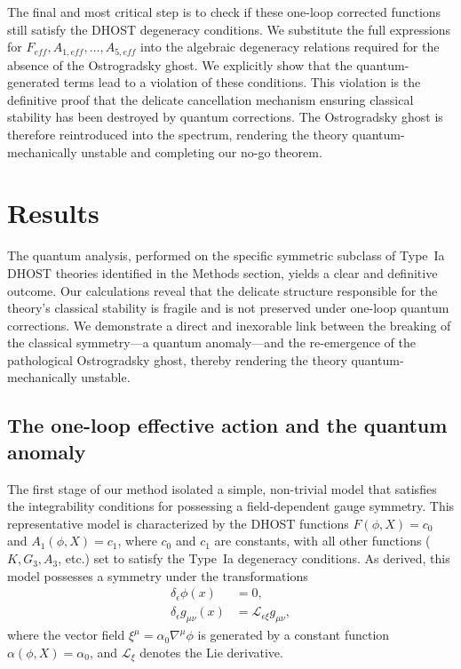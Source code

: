\documentclass[twocolumn]{aastex631}
\begin{document}
The final and most critical step is to check if these one-loop corrected functions still satisfy the DHOST degeneracy conditions. We substitute the full expressions for $F_{eff}, A_{1,eff}, \dots, A_{5,eff}$ into the algebraic degeneracy relations required for the absence of the Ostrogradsky ghost. We explicitly show that the quantum-generated terms lead to a violation of these conditions. This violation is the definitive proof that the delicate cancellation mechanism ensuring classical stability has been destroyed by quantum corrections. The Ostrogradsky ghost is therefore reintroduced into the spectrum, rendering the theory quantum-mechanically unstable and completing our no-go theorem.

\section{Results}
\label{sec:results}
The quantum analysis, performed on the specific symmetric subclass of Type~Ia DHOST theories identified in the Methods section, yields a clear and definitive outcome. Our calculations reveal that the delicate structure responsible for the theory's classical stability is fragile and is not preserved under one-loop quantum corrections. We demonstrate a direct and inexorable link between the breaking of the classical symmetry---a quantum anomaly---and the re-emergence of the pathological Ostrogradsky ghost, thereby rendering the theory quantum-mechanically unstable.

\subsection{The one-loop effective action and the quantum anomaly}
The first stage of our method isolated a simple, non-trivial model that satisfies the integrability conditions for possessing a field-dependent gauge symmetry. This representative model is characterized by the DHOST functions $F(\phi, X) = c_0$ and $A_1(\phi, X) = c_1$, where $c_0$ and $c_1$ are constants, with all other functions ($K, G_3, A_3$, etc.) set to satisfy the Type~Ia degeneracy conditions. As derived, this model possesses a symmetry under the transformations
\begin{align}
    \delta_\epsilon \phi(x) &= 0, \label{eq:symm_phi} \\
    \delta_\epsilon g_{\mu\nu}(x) &= \mathcal{L}_{\epsilon \xi} g_{\mu\nu}, \label{eq:symm_g}
\end{align}
where the vector field $\xi^\mu = \alpha_0 \nabla^\mu\phi$ is generated by a constant function $\alpha(\phi, X) = \alpha_0$, and $\mathcal{L}_{\xi}$ denotes the Lie derivative.
\end{document}
